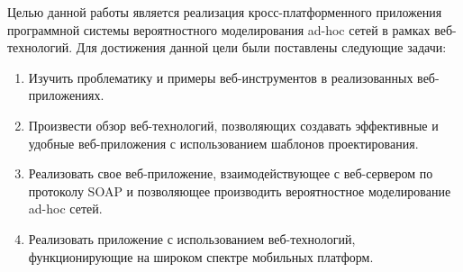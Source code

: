 Целью данной работы является реализация кросс-платформенного приложения программной системы вероятностного моделирования ad-hoc сетей в рамках веб-технологий. Для достижения данной цели были поставлены следующие задачи:
\begin{enumerate}
 \item Изучить проблематику и примеры веб-инструментов в реализованных веб-приложениях.
 \item Произвести обзор веб-технологий, позволяющих создавать эффективные и удобные веб-приложения с использованием шаблонов проектирования.
 \item Реализовать свое веб-приложение, взаимодействующее с веб-сервером по протоколу SOAP и позволяющее производить вероятностное моделирование ad-hoc сетей.
 \item Реализовать приложение с использованием веб-технологий, функционирующие на широком спектре мобильных платформ.
\end{enumerate}

\clearpage